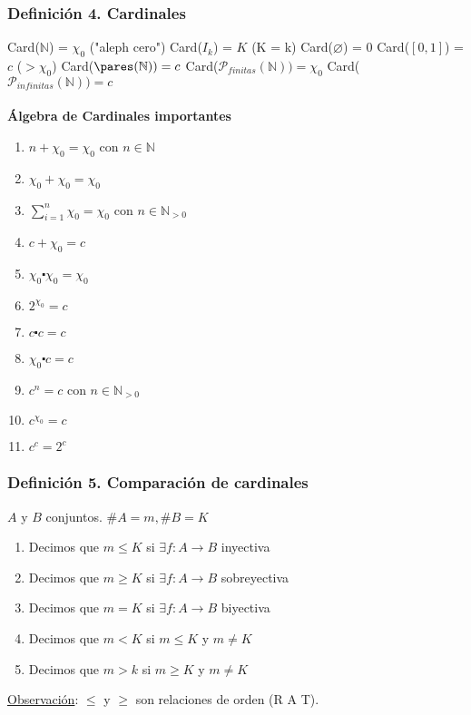 \documentclass{article}
\newcommand{\naturales}{\mathbb{N}}                     %
\newcommand{\partes}{\mathcal{P}}
\newcommand{\sumatoria}[2]{\sum_{#1} ^{#2}}
\begin{document}
\subsubsection*{Definición 4. Cardinales}
Card($\naturales$) = $\chi_0$ ("aleph cero")
\newline Card($I_k$) = $K$ (K = k)
\newline Card($\varnothing$) = $0$
\newline Card($[0,1]$) = $c$ ($> \chi_0$) 
\newline Card($\pares(\naturales)) = c$
\newline Card($\partes_{finitas}(\naturales)) = \chi_0$
\newline Card($\partes_{infinitas}(\naturales)) = c$
\\\\\textbf{Álgebra de Cardinales importantes}
\begin{enumerate}
    \item $n + \chi_0 = \chi_0$ con $n \in \naturales$
    \item $\chi_0 + \chi_0 = \chi_0$
    \item $\sumatoria{i=1}{n} \chi_0 = \chi_0$ con $n \in \naturales_{>0}$
    \item $c + \chi_0 = c$
    \item $\chi_0 \centerdot \chi_0 = \chi_0$
    \item $2^{\chi_0} = c$
    \item $c \centerdot c = c$
    \item $\chi_0 \centerdot c = c$
    \item $c^n = c$ con $n \in \naturales_{>0}$
    \item $c^{\chi_0} = c$
    \item $c^c = 2^c$
\end{enumerate}

\subsubsection*{Definición 5. Comparación de cardinales}
$A$ y $B$ conjuntos. $\#A = m,  \#B = K$
\begin{enumerate}
    \item Decimos que $m \leq K$ si $\exists f: A \rightarrow B$ inyectiva
    \item Decimos que $m \geq K$ si $\exists f: A \rightarrow B$ sobreyectiva
    \item Decimos que $m = K$ si $\exists f: A \rightarrow B$ biyectiva
    \item Decimos que $m < K$ si $m \leq K$ y $m \neq K$
    \item Decimos que $m > k$ si $m \geq K$ y $m \neq K$
\end{enumerate}
\underline{Observación}: $\leq$ y $\geq$ son relaciones de orden (R A T).
\end{document}
